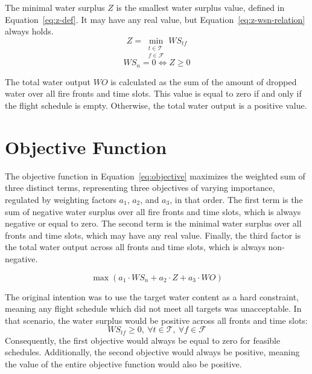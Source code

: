 The minimal water surplus $Z$ is the smallest water surplus value, defined in Equation~\ref{eq:z-def}.
It may have any real value, but Equation~\ref{eq:z-wsn-relation} always holds.
\begin{equation}\label{eq:z-def}
Z = \min_{\substack{t \in \mathcal{T}\\f \in \mathcal{F}}} \mathit{WS}_{tf}
\end{equation}
\begin{equation}\label{eq:z-wsn-relation}
\mathit{WS}_n = 0 \iff Z \ge 0
\end{equation}

The total water output $\mathit{WO}$ is calculated as the sum of the amount of dropped water over all fire fronts and time slots.
This value is equal to zero if and only if the flight schedule is empty.
Otherwise, the total water output is a positive value.


\section{Objective Function}\label{sec:objective}

The objective function in Equation~\ref{eq:objective} maximizes the weighted sum of three distinct terms, representing three objectives of varying importance, regulated by weighting factors $a_1$, $a_2$, and $a_3$, in that order.
The first term is the sum of negative water surplus over all fire fronts and time slots, which is always negative or equal to zero.
The second term is the minimal water surplus over all fronts and time slots, which may have any real value.
Finally, the third factor is the total water output across all fronts and time slots, which is always non-negative.

\begin{equation}\label{eq:objective}
\max \left( a_1 \cdot \mathit{WS}_n
    + a_2 \cdot Z
    + a_3 \cdot \mathit{WO} \right)
\end{equation}

The original intention was to use the target water content as a hard constraint, meaning any flight schedule which did not meet all targets was unacceptable.
In that scenario, the water surplus would be positive across all fronts and time slots:
\begin{equation}
\mathit{WS}_{tf} \ge 0,\ \forall t \in \mathcal{T},\ \forall f \in \mathcal{F}
\end{equation}
Consequently, the first objective would always be equal to zero for feasible schedules.
Additionally, the second objective would always be positive, meaning the value of the entire objective function would also be positive.

